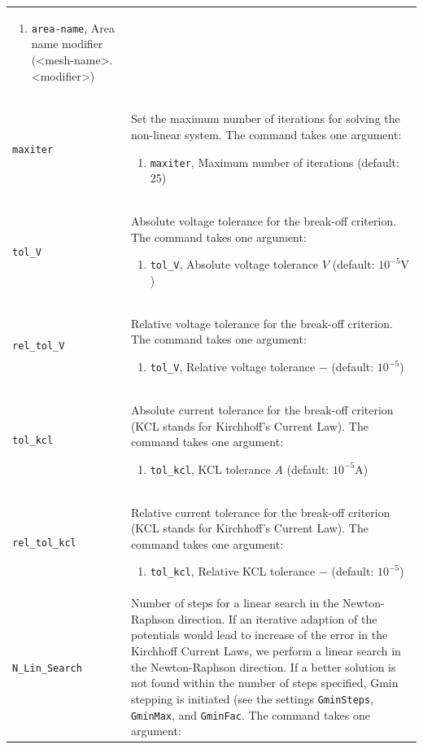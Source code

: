 \documentclass[noshowpacs,preprintnumbers,amsmath,amssymb, letter]{revtex4}
\begin{document}
\begin{longtable}{p{}p{}}
\begin{enumerate}
\item \texttt{area-name}, Area name modifier (\textless mesh-name\textgreater .\textless modifier\textgreater )
\end{enumerate}\\
\texttt{maxiter}	&  Set the maximum number of iterations for solving the non-linear system. The command takes one argument:
\begin{enumerate}
\item \texttt{maxiter}, Maximum number of iterations (default: 25)
\end{enumerate}\\
\texttt{tol\_V}	&  Absolute voltage tolerance for the break-off criterion. The command takes one argument:
\begin{enumerate}
\item \texttt{tol\_V}, Absolute voltage tolerance $V$ (default: $10^{-5} \text{V}$)
\end{enumerate}\\
\texttt{rel\_tol\_V}	&  Relative voltage tolerance for the break-off criterion. The command takes one argument:
\begin{enumerate}
\item \texttt{tol\_V}, Relative voltage tolerance $-$ (default: $10^{-5}$)
\end{enumerate}\\
\texttt{tol\_kcl}	&  Absolute current tolerance for the break-off criterion (KCL stands for Kirchhoff's Current Law). The command takes one argument:
\begin{enumerate}
\item \texttt{tol\_kcl}, KCL tolerance $A$ (default: $10^{-5} \text{A}$)
\end{enumerate}\\
\texttt{rel\_tol\_kcl}	&  Relative current tolerance for the break-off criterion (KCL stands for Kirchhoff's Current Law). The command takes one argument:
\begin{enumerate}
\item \texttt{tol\_kcl}, Relative KCL tolerance $-$ (default: $10^{-5}$)
\end{enumerate}\\
\texttt{N\_Lin\_Search}	&  Number of steps for a linear search in the Newton-Raphson direction. If an iterative adaption of the potentials would lead to increase of the error in the Kirchhoff Current Laws, we perform a linear search in the Newton-Raphson direction. If a better solution is not found within the number of steps specified, Gmin stepping is initiated (see the settings \texttt{GminSteps}, \texttt{GminMax}, and \texttt{GminFac}. The command takes one argument:

\end{longtable}
\end{document}
